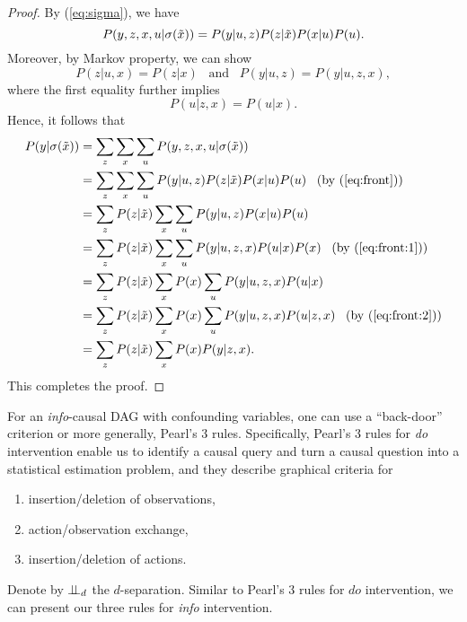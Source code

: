 \begin{proof}
By (\ref{eq:sigma}), we have
	\begin{equation}
	\label{eq:front}
	P(y, z, x, u| \mathrm{\sigma}(\tilde{x}) )= P(y|u,z) P(z|\tilde{x}) P(x|u) P(u).
	\end{equation}
Moreover, by Markov property, 
we can show 
\begin{equation}
	\label{eq:front:1}
P(z|u,x)=P(z|x) \,\,\,\mbox{ and }\,\,\,P(y|u,z)=P(y|u,z,x),
\end{equation}
where the first equality further implies 
\begin{equation}
	\label{eq:front:2}
P(u|z,x)=P(u|x).
\end{equation}
Hence, it follows that
	\begin{align*}
	P(y|\mathrm{\sigma}(\tilde{x})) &= \sum_z \sum_x \sum_u P(y, z, x, u| \mathrm{\sigma}(\tilde{x}) ) \\
	&= \sum_z \sum_x \sum_u P(y|u,z) P(z|\tilde{x}) P(x|u) P(u) \,\,\,\,\,(\mbox{by }(\ref{eq:front})) \\
	&= \sum_{z} P(z|\tilde{x}) \sum_x \sum_u P(y|u,z)  P(x|u) P(u) \\
	&= \sum_{z} P(z|\tilde{x}) \sum_x \sum_u P(y|u,z, x)  P(u|x) P(x) \,\,\,\,\,(\mbox{by }(\ref{eq:front:1}))\\
	&= \sum_{z} P(z|\tilde{x}) \sum_x P(x) \sum_u P(y|u,z, x)  P(u|x) \\
	&= \sum_{z} P(z|\tilde{x}) \sum_x P(x) \sum_u P(y|u,z, x)  P(u|z, x) \,\,\,\,\,(\mbox{by }(\ref{eq:front:2}))\\
	&= \sum_{z} P(z|\tilde{x}) \sum_x P(x)  P(y|z, x). 
	\end{align*}
This completes the proof. 	
\end{proof}


For an \emph{info}-causal DAG with confounding variables, 
one can use a  ``back-door'' criterion or more generally,  
Pearl's 3 rules. Specifically, Pearl's 3 rules for \emph{do} intervention enable us to identify a causal query and turn a causal question into a statistical estimation problem, and they describe graphical criteria for
\begin{enumerate}[1.]
	\setlength{\itemsep}{0em}
	\item insertion/deletion of observations,
	\item action/observation exchange,
	\item insertion/deletion of actions.
\end{enumerate}
Denote by $\perp\mkern-9.5mu\perp_d$ the $d$-separation.
Similar to Pearl's 3 rules for $do$ intervention, we can present our three rules for \emph{info} intervention.

